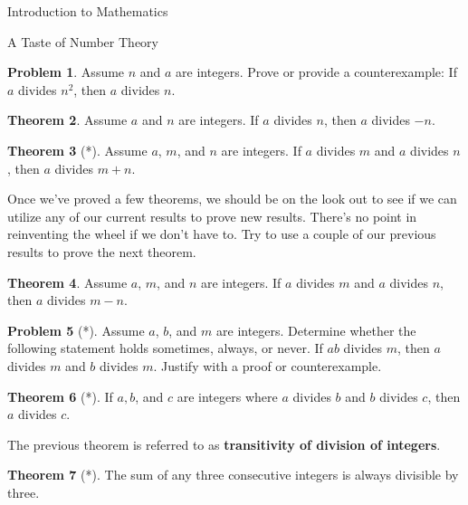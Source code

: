 \documentclass[11pt]{article}
\theoremstyle{definition}
\newtheorem{theorem}{Theorem}[section]
\newtheorem{problem}[theorem]{Problem}
\begin{document}
\begin{section}{Introduction to Mathematics}
\begin{subsection}{A Taste of Number Theory}
\begin{problem}
Assume $n$ and $a$ are integers.  Prove or provide a counterexample:  If $a$ divides $n^2$, then $a$ divides $n$.
\end{problem}

\begin{theorem}
Assume $a$ and $n$ are integers. If $a$ divides $n$, then $a$ divides $-n$. 
\end{theorem}

\begin{theorem}[*]
Assume $a$, $m$, and $n$ are integers. If $a$ divides $m$ and $a$ divides $n$, then $a$ divides $m+n$. 
\end{theorem}

Once we've proved a few theorems, we should be on the look out to see if we can utilize any of our current results to prove new results.  There's no point in reinventing the wheel if we don't have to.  Try to use a couple of our previous results to prove the next theorem.

\begin{theorem}
Assume $a$, $m$, and $n$ are integers. If $a$ divides $m$ and $a$ divides $n$, then $a$ divides $m-n$.
\end{theorem}

\begin{problem}[*]
Assume $a$, $b$, and $m$ are integers. Determine whether the following statement holds sometimes, always, or never.  If $ab$ divides $m$, then $a$ divides $m$ and $b$ divides $m$.  Justify with a proof or counterexample.
\end{problem}

\begin{theorem}[*]
If $a, b$, and $c$ are integers where $a$ divides $b$ and $b$ divides $c$, then $a$ divides $c$.
\end{theorem}

The previous theorem is referred to as \textbf{transitivity of division of integers}.

\begin{theorem}[*]
The sum of any three consecutive integers is always divisible by three.\end{theorem}

\end{subsection}

\end{section}
\end{document}
